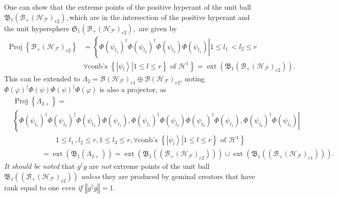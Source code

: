 \documentclass[aps,preprint]{revtex4}%
\begin{document}
One can show \cite{Kadison} that the extreme points of the positive hyperant
of the unit ball $\mathfrak{B}_{1}\left(  \mathcal{B}_{+}\left(
\mathcal{H}_{\mathcal{F}}\right)  _{e2}\right)  ,$which are in the
intersection of the positive hyperant and the unit hypersphere $\mathfrak{S}%
_{1}\left(  \mathcal{B}_{+}\left(  \mathcal{H}_{\mathcal{F}}\right)
_{e2}\right)  ,$ are given by
\begin{align}
\operatorname*{Proj}\left\{  \mathcal{B}_{+}\left(  \mathcal{H}_{\mathcal{F}%
}\right)  _{e2}\right\}   &  =\left\{  \left.  \Phi\left(  \psi_{l_{1}%
}\right)  ^{\dagger}\Phi\left(  \psi_{l_{2}}\right)  ^{\dagger}\Phi\left(
\psi_{l_{2}}\right)  \Phi\left(  \psi_{l_{1}}\right)  \right\vert \right.
1\leq l_{1}\,<l_{2}\leq r\nonumber\\
&  \left.  \forall\text{conb's }\left\{  \left.  \left\vert \psi
_{l}\right\rangle \right\vert 1\leq l\leq r\right\}  \text{ of }%
\mathcal{H}^{1}\right\}  =\operatorname*{ext}\left(  \mathfrak{B}_{1}\left(
\mathcal{B}_{+}\left(  \mathcal{H}_{\mathcal{F}}\right)  _{e2}\right)
\right)  .
\end{align}
This can be extended to $\Lambda_{2}=\mathcal{B}\left(  \mathcal{H}%
_{\mathcal{F}}\right)  _{e1}\oplus\mathcal{B}\left(  \mathcal{H}_{\mathcal{F}%
}\right)  _{e2}$, noting $\Phi\left(  \varphi\right)  ^{\dagger}\Phi\left(
\psi\right)  \Phi\left(  \psi\right)  ^{\dagger}\Phi\left(  \varphi\right)  $
is also a projector, as
\begin{align}
&  \operatorname*{Proj}\left\{  \Lambda_{2+}\right\}  =\nonumber\\
&  \left\{  \left.  \Phi\left(  \psi_{l_{1}}\right)  ^{\dagger}\Phi\left(
\psi_{l_{2}}\right)  ^{\dagger}\Phi\left(  \psi_{l_{2}}\right)  \Phi\left(
\psi_{l_{1}}\right)  ,\Phi\left(  \psi_{l_{1}}\right)  ^{\dagger}\Phi\left(
\psi_{l_{2}}\right)  \Phi\left(  \psi_{l_{2}}\right)  ^{\dagger}\Phi\left(
\psi_{l_{1}}\right)  ,\Phi\left(  \psi_{l_{3}}\right)  ^{\dagger}\Phi\left(
\psi_{l_{3}}\right)  \right\vert \right. \nonumber\\
&  \left.  \qquad\qquad\qquad\right.  1\leq l_{1}\,,l_{2}\leq r,1\leq
l_{3}\leq r,\left.  \forall\text{conb's }\left\{  \left.  \left\vert \psi
_{l}\right\rangle \right\vert 1\leq l\leq r\right\}  \text{ of }%
\mathcal{H}^{1}\right\} \nonumber\\
&  \left.  \qquad\qquad=\right.  \operatorname*{ext}\left(  \mathfrak{B}%
_{1}\left(  \Lambda_{2+}\right)  \right)  =\operatorname*{ext}\left(
\mathfrak{B}_{1}\left(  \left(  \mathcal{B}_{+}\left(  \mathcal{H}%
_{\mathcal{F}}\right)  _{e2}\right)  \right)  \right)  \cup\operatorname*{ext}%
\left(  \mathfrak{B}_{1}\left(  \left(  \mathcal{B}_{+}\left(  \mathcal{H}%
_{\mathcal{F}}\right)  _{e1}\right)  \right)  \right)  .
\end{align}
\emph{It should be noted} that $g^{\dagger}g$ are \emph{not }extreme points of
the unit ball $\mathfrak{B}_{1}\left(  \left(  \mathcal{B}_{+}\left(
\mathcal{H}_{\mathcal{F}}\right)  _{e2}\right)  \right)  $ \emph{unless }they
are produced by geminal creators that have rank equal to one \emph{even if
}$\left\Vert g^{\dagger}g\right\Vert =1$.
\end{document}
